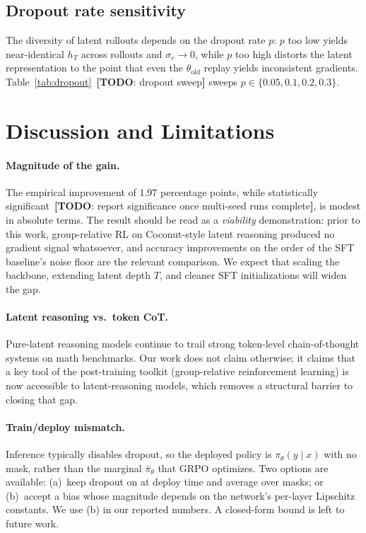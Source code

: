 \documentclass[11pt]{article}
\theoremstyle{definition}
\theoremstyle{remark}
\newcommand{\old}{\mathrm{old}}
\newcommand{\answerTODO}[1][]{{\color{red}\textbf{[TODO}#1\textbf{]}}}
\begin{document}
\subsection{Dropout rate sensitivity}
\label{sec:ablations-dropout}

The diversity of latent rollouts depends on the dropout rate $p$:
$p$ too low yields near-identical $h_T$ across rollouts and
$\sigma_r \to 0$, while $p$ too high distorts the latent
representation to the point that even the $\theta_\old$ replay yields
inconsistent gradients.  Table~\ref{tab:dropout}~\answerTODO[: dropout sweep]
sweeps $p \in \{0.05, 0.1, 0.2, 0.3\}$.

\section{Discussion and Limitations}
\label{sec:disc}

\paragraph{Magnitude of the gain.}
The empirical improvement of $1.97$ percentage points, while
statistically significant~\answerTODO[: report significance once
multi-seed runs complete], is modest in absolute terms.  The result
should be read as a \emph{viability} demonstration: prior to this
work, group-relative RL on Coconut-style latent reasoning produced no
gradient signal whatsoever, and accuracy improvements on the order of
the SFT baseline's noise floor are the relevant comparison.  We
expect that scaling the backbone, extending latent depth $T$, and
cleaner SFT initializations will widen the gap.

\paragraph{Latent reasoning vs.\ token CoT.}
Pure-latent reasoning models continue to trail strong token-level
chain-of-thought systems on math benchmarks.  Our work does not claim
otherwise; it claims that a key tool of the post-training toolkit
(group-relative reinforcement learning) is now accessible to
latent-reasoning models, which removes a structural barrier to
closing that gap.

\paragraph{Train/deploy mismatch.}
Inference typically disables dropout, so the deployed policy is
$\pi_\theta(y \mid x)$ with no mask, rather than the marginal
$\bar\pi_\theta$ that GRPO optimizes.  Two options are available:
(a)~keep dropout on at deploy time and average over masks; or
(b)~accept a bias whose magnitude depends on the network's per-layer
Lipschitz constants.  We use (b) in our reported numbers.  A
closed-form bound is left to future work.
\end{document}
